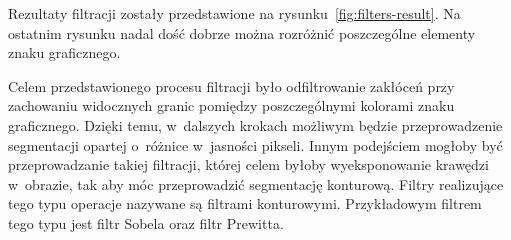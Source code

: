 Rezultaty filtracji zostały przedstawione na rysunku~\ref{fig:filters-result}. Na ostatnim rysunku nadal dość dobrze można rozróżnić poszczególne elementy znaku graficznego.

Celem przedstawionego procesu filtracji było odfiltrowanie zakłóceń przy zachowaniu widocznych granic pomiędzy poszczególnymi kolorami znaku graficznego. Dzięki temu, w~dalszych krokach możliwym będzie przeprowadzenie segmentacji opartej o~różnice w~jasności pikseli. Innym podejściem mogłoby być przeprowadzanie  takiej filtracji, której celem byłoby wyeksponowanie krawędzi w~obrazie, tak aby móc przeprowadzić segmentację konturową. Filtry realizujące tego typu operacje nazywane są filtrami konturowymi. Przykładowym filtrem tego typu jest filtr Sobela oraz filtr Prewitta.

\begin{figure}[H]
    \centering
    \\

\end{figure}
